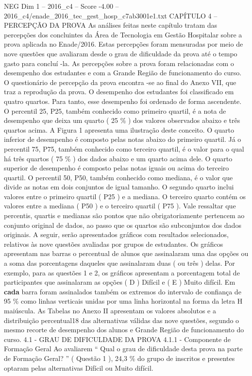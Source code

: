 \begin{textsample}{NEG Dim 1 – 2016\_c4 – Score -4.00 – 2016\_c4/enade\_2016\_tec\_gest\_hosp\_c7ab3001e1.txt}  \label{ex:f1_neg_154}
CAPÍTULO 4 – PERCEPÇÃO DA PROVA As análises feitas neste capítulo tratam das percepções dos concluintes da Área de Tecnologia em Gestão Hospitalar sobre a prova aplicada no Enade/2016.
Estas percepções foram mensuradas por meio de nove questões que avaliaram desde o grau de dificuldade da prova até o tempo gasto para concluí -la.
As percepções sobre a prova foram relacionadas com o desempenho dos estudantes e com a Grande Região de funcionamento do curso.
O questionário de percepção da prova encontra -se ao final do Anexo VII, que traz a reprodução da prova.
O desempenho dos estudantes foi classificado em quatro quartos.
Para tanto, esse desempenho foi ordenado de forma ascendente.
O percentil 25, P25, também conhecido como primeiro quartil, é a nota de desempenho que deixa um quarto ( 25 \% ) dos valores observados abaixo e três quartos acima.
A Figura 1 apresenta uma ilustração deste conceito.
O quarto inferior de desempenho é composto pelas notas abaixo do primeiro quartil.
Já o percentil 75, P75, também conhecido como terceiro quartil, é o valor para o qual há três quartos ( 75 \% ) dos dados abaixo e um quarto acima dele.
O quarto superior de desempenho é composto pelas notas iguais ou acima do terceiro quartil.
O percentil 50, P50, também conhecido como mediana, é o valor que divide as notas em dois conjuntos de igual tamanho.
O segundo quarto inclui valores entre o primeiro quartil ( P25 ) e a mediana.
O terceiro quarto contém os valores entre a mediana ( P50 ) e o terceiro quartil ( P75 ).
Vale ressaltar que percentis, quartis e medianas são pontos que não obrigatoriamente pertencem ao conjunto original de dados, ao passo que os quartos são subconjuntos dos dados originais.
A seguir, serão apresentados gráficos com resultados selecionados, relativos às nove questões avaliadas por grupos de estudantes.
Os gráficos apresentam nas barras o percentual de alunos que assinalaram uma das opções ou a soma das porcentagens daqueles que assinalaram duas ( ou três ) delas.
Por exemplo, para as questões 1 e 2, os gráficos apresentam a porcentagem total de participantes que assinalaram as opções ( D ) Difícil e ( E ) Muito difícil.
Em \textbf{cada} barra foram assinalados também os extremos do intervalo de confiança de 95 \% como linhas verticais unidas por uma linha horizontal na forma da letra H maiúscula.
As Tabelas no Anexo II apresentam os valores absolutos e a distribuição percentual18 das alternativas válidas das nove questões, segundo o mesmo recorte de desempenho dos alunos e Grande Região de funcionamento do curso. 4.1 - GRAU DE DIFICULDADE DA PROVA 4.1.1 - Componente de Formação Geral Ao avaliarem “ Qual o grau de dificuldade desta prova na parte de Formação Geral? ” ( Questão 1 ), 24,3 \% do grupo de inscritos e presentes optaram pelas alternativas Difícil ou Muito difícil.

\end{textsample}
